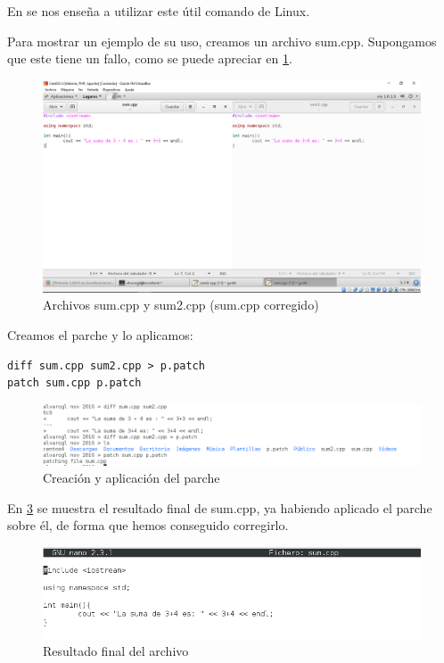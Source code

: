 En \cite{patch} se nos enseña a utilizar este útil comando de Linux.

Para mostrar un ejemplo de su uso, creamos un archivo sum.cpp. Supongamos que este tiene un fallo, como se puede apreciar en \ref{ise21}.

\begin{figure}[H]
	\centering
	\includegraphics[scale=0.45]{ise21.png}
	\caption{Archivos sum.cpp y sum2.cpp (sum.cpp corregido)} \label{ise21}
\end{figure}

Creamos el parche y lo aplicamos:

\begin{verbatim}
diff sum.cpp sum2.cpp > p.patch
patch sum.cpp p.patch
\end{verbatim}

\begin{figure}[H]
	\centering
	\includegraphics[scale=0.6]{ise22.png}
	\caption{Creación y aplicación del parche} \label{ise22}
\end{figure}

En \ref{ise23} se muestra el resultado final de sum.cpp, ya habiendo aplicado el parche sobre él, de forma que hemos conseguido corregirlo.

\begin{figure}[H]
	\centering
	\includegraphics[scale=0.6]{ise23.png}
	\caption{Resultado final del archivo} \label{ise23}
\end{figure}

